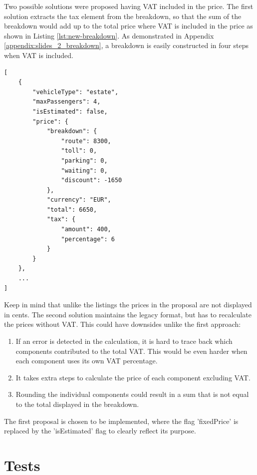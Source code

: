 Two possible solutions were proposed having VAT included in the price. The first solution extracts the tax element from the breakdown, so that the sum of the breakdown would add up to the total price where VAT is included in the price as shown in Listing \ref{lst:new-breakdown}. As demonstrated in Appendix \ref{appendix:slides_2_breakdown}, a breakdown is easily constructed in four steps when VAT is included.

\begin{lstlisting}[caption={Improved price breakdown}, label={lst:new-breakdown}]
[
	{
		"vehicleType": "estate",
		"maxPassengers": 4,
		"isEstimated": false,
		"price": {
			"breakdown": {
				"route": 8300,
				"toll": 0,
				"parking": 0,
				"waiting": 0,
				"discount": -1650
			},
			"currency": "EUR",
			"total": 6650,
			"tax": {
				"amount": 400,
				"percentage": 6
			}
		}
	},
	...
]
\end{lstlisting}

Keep in mind that unlike the listings the prices in the proposal are not displayed in cents. The second solution maintains the legacy format, but has to recalculate the prices without VAT. This could have downsides unlike the first approach:

\begin{enumerate}
	\item If an error is detected in the calculation, it is hard to trace back which components contributed to the total VAT. This would be even harder when each component uses its own VAT percentage.
	\item It takes extra steps to calculate the price of each component excluding VAT.
	\item Rounding the individual components could result in a sum that is not equal to the total displayed in the breakdown.
\end{enumerate}

The first proposal is chosen to be implemented, where the flag 'fixedPrice' is replaced by the 'isEstimated' flag to clearly reflect its purpose.


\section{Tests}



